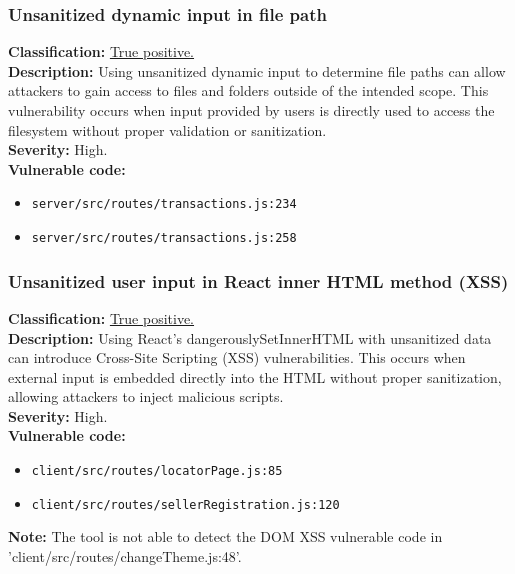 \documentclass[]{article}
\begin{document}
\subsubsection{Unsanitized dynamic input in file path}
\textbf{Classification:} \hyperref[subsubsec:improper_limitation_of_a_pathname_to_a_restricted_directory]{True positive.} \\
\textbf{Description:} Using unsanitized dynamic input to determine file paths can allow attackers to gain access to files and folders outside of the intended scope. This vulnerability occurs when input provided by users is directly used to access the filesystem without proper validation or sanitization. \\ 
\textbf{Severity:} High. \\ 
\textbf{Vulnerable code:}
\begin{itemize}
    \item \texttt{server/src/routes/transactions.js:234}
    \item \texttt{server/src/routes/transactions.js:258}
\end{itemize}

\subsubsection{Unsanitized user input in React inner HTML method (XSS)}
\textbf{Classification:} \hyperref[subsubsec:cross_site_scripting]{True positive.} \\
\textbf{Description:} Using React's dangerouslySetInnerHTML with unsanitized data can introduce Cross-Site Scripting (XSS) vulnerabilities. This occurs when external input is embedded directly into the HTML without proper sanitization, allowing attackers to inject malicious scripts. \\ 
\textbf{Severity:} High. \\ 
\textbf{Vulnerable code:}
\begin{itemize}
    \item \texttt{client/src/routes/locatorPage.js:85}
    \item \texttt{client/src/routes/sellerRegistration.js:120}
\end{itemize}
\textbf{Note:} The tool is not able to detect the DOM XSS vulnerable code in 'client/src/routes/changeTheme.js:48'. \\
\end{document}
